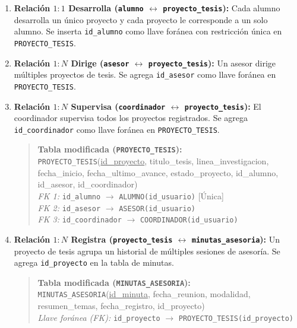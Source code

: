 \begin{enumerate}
    \item \textbf{Relación $1:1$ Desarrolla (\texttt{alumno} $\leftrightarrow$ \texttt{proyecto\_tesis}):} Cada alumno desarrolla un único proyecto y cada proyecto le corresponde a un solo alumno. Se inserta \texttt{id\_alumno} como llave foránea con restricción única en \texttt{PROYECTO\_TESIS}.
    \item \textbf{Relación $1:N$ Dirige (\texttt{asesor} $\leftrightarrow$ \texttt{proyecto\_tesis}):} Un asesor dirige múltiples proyectos de tesis. Se agrega \texttt{id\_asesor} como llave foránea en \texttt{PROYECTO\_TESIS}.
    \item \textbf{Relación $1:N$ Supervisa (\texttt{coordinador} $\leftrightarrow$ \texttt{proyecto\_tesis}):} El coordinador supervisa todos los proyectos registrados. Se agrega \texttt{id\_coordinador} como llave foránea en \texttt{PROYECTO\_TESIS}.
    \begin{quote}
        \textbf{Tabla modificada (\texttt{PROYECTO\_TESIS}):} \\
        \texttt{PROYECTO\_TESIS}(\underline{id\_proyecto}, titulo\_tesis, linea\_investigacion, fecha\_inicio, fecha\_ultimo\_avance, estado\_proyecto, id\_alumno, id\_asesor, id\_coordinador) \\
        \textit{FK 1:} \texttt{id\_alumno} $\rightarrow$ \texttt{ALUMNO(id\_usuario)} [Única] \\
        \textit{FK 2:} \texttt{id\_asesor} $\rightarrow$ \texttt{ASESOR(id\_usuario)} \\
        \textit{FK 3:} \texttt{id\_coordinador} $\rightarrow$ \texttt{COORDINADOR(id\_usuario)}
    \end{quote}

    \item \textbf{Relación $1:N$ Registra (\texttt{proyecto\_tesis} $\leftrightarrow$ \texttt{minutas\_asesoria}):} Un proyecto de tesis agrupa un historial de múltiples sesiones de asesoría. Se agrega \texttt{id\_proyecto} en la tabla de minutas.
    \begin{quote}
        \textbf{Tabla modificada (\texttt{MINUTAS\_ASESORIA}):} \\
        \texttt{MINUTAS\_ASESORIA}(\underline{id\_minuta}, fecha\_reunion, modalidad, resumen\_temas, fecha\_registro, id\_proyecto) \\
        \textit{Llave foránea (FK):} \texttt{id\_proyecto} $\rightarrow$ \texttt{PROYECTO\_TESIS(id\_proyecto)}
    \end{quote}


\end{enumerate}

